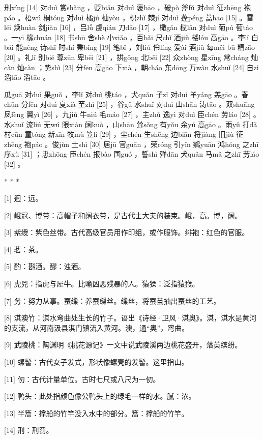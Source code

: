 \documentclass[12pt,UTF8]{ctexbook}
\begin{document}
刑xíng [14] 对duì 赏shǎng ，贬biǎn 对duì 褒bāo ，破pò 斧fǔ 对duì 征zhēng 袍páo 。梧wú 桐tóng 对duì 橘jú 柚yòu ，枳zhǐ 棘jí 对duì 蓬péng 蒿hāo [15] 。雷léi 焕huàn 剑jiàn [16] ，吕lǚ 虔qián 刀dāo [17] ，橄gǎn 榄lǎn 对duì 葡pú 萄táo 。一yī 椽chuán [18] 书shū 舍shè 小xiǎo ，百bǎi 尺chǐ 酒jiǔ 楼lóu 高gāo 。李lǐ 白bái 能néng 诗shī 时shí 秉bǐng [19] 笔bǐ ，刘liú 伶líng 爱ài 酒jiǔ 每měi bū 糟zāo [20] 。礼lǐ 别bié 尊zūn 卑bēi [21] ，拱gǒng 北běi [22] 众zhòng 星xīng 常cháng 灿càn 灿càn ；势shì [23] 分fēn 高gāo 下xià ，朝cháo 东dōng 万wàn 水shuǐ [24] 自zì 滔tāo 滔tāo 。

瓜guā 对duì 果guǒ ，李lǐ 对duì 桃táo ，犬quǎn 子zǐ 对duì 羊yáng 羔gāo 。春chūn 分fēn 对duì 夏xià 至zhì [25] ，谷gǔ 水shuǐ 对duì 山shān 涛tāo 。双shuāng 凤fèng 翼yì [26] ，九jiǔ 牛niú 毛máo [27] ，主zhǔ 逸yì 对duì 臣chén 劳láo [28] 。水shuǐ 流liú 无wú 限xiàn 阔kuò ，山shān 耸sǒng 有yǒu 余yú 高gāo 。雨yǔ 打dǎ 村cūn 童tóng 新xīn 牧mù 笠lì [29] ，尘chén 生shēng 边biān 将jiàng 旧jiù 征zhēng 袍páo 。俊jùn 士shì [30] 居jū 官guān ，荣róng 引yǐn 鹓yuān 鸿hóng 之zhī 序xù [31] ；忠zhōng 臣chén 报bào 国guó ，誓shì 殚dān 犬quǎn 马mǎ 之zhī 劳láo [32] 。



* * *



[1] 迥：远。

[2] 峨冠、博带：高帽子和阔衣带，是古代士大夫的装束。峨，高。博，阔。

[3] 紫绶：紫色丝带。古代高级官员用作印组，或作服饰。绯袍：红色的官服。

[4] 茗：茶。

[5] 酌：斟酒。醪：浊酒。

[6] 虎兕：指虎与犀牛。比喻凶恶残暴的人。猿猱：泛指猿猴。

[7] 务：努力从事。蚕缫：养蚕缫丝。缫丝，将蚕茧抽出蚕丝的工艺。

[8] 淇澳竹：淇水弯曲处生长的竹子。语出《诗经·卫风·淇奥》。淇，淇水是黄河的支流，从河南汲县淇门镇流入黄河。澳，通“奥”，弯曲。

[9] 武陵桃：陶渊明《桃花源记》一文中说武陵溪两边桃花盛开，落英缤纷。

[10] 螺髻：古代女子发式，形状像螺壳的发髻。这里指山。

[11] 仞：古代计量单位。古时七尺或八尺为一仞。

[12] 鸭头：此处指颜色像公鸭头上的绿毛一样的水。腻：浓。

[13] 半篙：撑船的竹竿没入水中的部分。篙：撑船的竹竿。

[14] 刑：刑罚。
\end{document}
